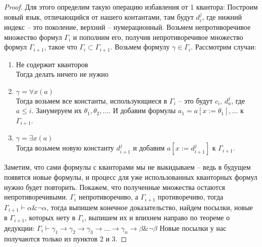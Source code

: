\begin{proof}
Для этого определим такую операцию избавления от 1 квантора: Построим новый язык, отличающийся от нашего контантами, там будут $d_i^j$, где нижний индекс -- это поколение, верхний – нумерационный. Возьмем непротиворечивое множество формул $\Gamma_i$ и пополним его, получив непротиворечивое множество формул $\Gamma_{i+1}$, такое что $\Gamma_i \subset \Gamma_{i+1}$. Возьмем формулу $\gamma \in \Gamma_{i}$. Рассмотрим случаи:
\begin{enumerate}
\item Не содержит кванторов\\
Тогда делать ничего не нужно
\item $\gamma = \forall x (a)$\\
Тогда возьмем все константы, использующиеся в $\Gamma_{i}$ -- это будут $c_i$, $d_a^j$, где $a \leq i$. Занумеруем их $\theta_1, \theta_2, \dots$. И добавим формулы $a_1=a[x:=\theta_1], \dots$ к $\Gamma_{i+1}$.
\item $\gamma = \exists x (a)$\\
Тогда возьмем новую константу $d_{i+1}^j$ и добавим $a[x:=d_{i+1}^j]$ к $\Gamma_{i+1}$.
\end{enumerate}

Заметим, что сами формулы с кванторами мы не выкидываем -- ведь в будущем появятся новые формулы, и процесс для уже использованных кванторных формул нужно будет повторить. Покажем, что полученные множества остаются непротиворечивыми. $\Gamma_i$ непротиворечиво, а $\Gamma_{i+1}$ противоречиво, тогда $\Gamma_{i+1} \vdash \alpha \& \neg \alpha$, тогда выпишем конечное доказательство, найдем посылки, новые в $\Gamma_{i+1}$, которых нету в $\Gamma_{i}$, выпишем их и впихнем направо по теореме о дедукции: $\Gamma_{i} \vdash \gamma_1 \to \gamma_2 \to \gamma_3 \to \dots \to \gamma_n \to \beta \& \neg \beta$ Новые посылки у нас получаются только из пунктов 2 и 3.


\end{proof}
